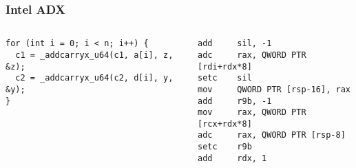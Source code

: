 \begin{frame}[fragile]
\frametitle{Intel ADX}
\begin{columns}[c] %
\begin{lstlisting}[frame=single, basicstyle=\tiny]
for (int i = 0; i < n; i++) {
  c1 = _addcarryx_u64(c1, a[i], z, &z);
  c2 = _addcarryx_u64(c2, d[i], y, &y);
}
\end{lstlisting}
\begin{lstlisting}[frame=single, basicstyle=\tiny, language={[x86masm]Assembler}]
add     sil, -1
adc     rax, QWORD PTR [rdi+rdx*8]
setc    sil
mov     QWORD PTR [rsp-16], rax
add     r9b, -1
mov     rax, QWORD PTR [rcx+rdx*8]
adc     rax, QWORD PTR [rsp-8]
setc    r9b
add     rdx, 1
\end{lstlisting}
\end{columns}
\end{frame}

